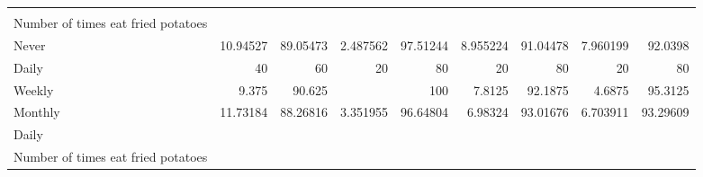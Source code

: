 \documentclass{article}
\begin{document}
\begin{table}[!h]
{\begin{tabular}{lllllllll}
				\multicolumn{1}{r}{} &
				\multicolumn{1}{r}{} &
				\multicolumn{1}{r}{} &
				\multicolumn{1}{r}{} &
				\multicolumn{1}{r}{} &
				\multicolumn{1}{r}{} \\
				\multicolumn{1}{l}{\hspace{4em}Number of times eat fried potatoes} &
				\multicolumn{1}{|r}{} &
				\multicolumn{1}{r}{} &
				\multicolumn{1}{r}{} &
				\multicolumn{1}{r}{} &
				\multicolumn{1}{r}{} &
				\multicolumn{1}{r}{} &
				\multicolumn{1}{r}{} &
				\multicolumn{1}{r}{} \\
				\multicolumn{1}{l}{\hspace{5em}Never} &
				\multicolumn{1}{|r}{10.94527} &
				\multicolumn{1}{r}{89.05473} &
				\multicolumn{1}{r}{2.487562} &
				\multicolumn{1}{r}{97.51244} &
				\multicolumn{1}{r}{8.955224} &
				\multicolumn{1}{r}{91.04478} &
				\multicolumn{1}{r}{7.960199} &
				\multicolumn{1}{r}{92.0398} \\
				\multicolumn{1}{l}{\hspace{5em}Daily} &
				\multicolumn{1}{|r}{40} &
				\multicolumn{1}{r}{60} &
				\multicolumn{1}{r}{20} &
				\multicolumn{1}{r}{80} &
				\multicolumn{1}{r}{20} &
				\multicolumn{1}{r}{80} &
				\multicolumn{1}{r}{20} &
				\multicolumn{1}{r}{80} \\
				\multicolumn{1}{l}{\hspace{5em}Weekly} &
				\multicolumn{1}{|r}{9.375} &
				\multicolumn{1}{r}{90.625} &
				\multicolumn{1}{r}{} &
				\multicolumn{1}{r}{100} &
				\multicolumn{1}{r}{7.8125} &
				\multicolumn{1}{r}{92.1875} &
				\multicolumn{1}{r}{4.6875} &
				\multicolumn{1}{r}{95.3125} \\
				\multicolumn{1}{l}{\hspace{5em}Monthly} &
				\multicolumn{1}{|r}{11.73184} &
				\multicolumn{1}{r}{88.26816} &
				\multicolumn{1}{r}{3.351955} &
				\multicolumn{1}{r}{96.64804} &
				\multicolumn{1}{r}{6.98324} &
				\multicolumn{1}{r}{93.01676} &
				\multicolumn{1}{r}{6.703911} &
				\multicolumn{1}{r}{93.29609} \\
				\multicolumn{1}{l}{\hspace{3em}Daily} &
				\multicolumn{1}{|r}{} &
				\multicolumn{1}{r}{} &
				\multicolumn{1}{r}{} &
				\multicolumn{1}{r}{} &
				\multicolumn{1}{r}{} &
				\multicolumn{1}{r}{} &
				\multicolumn{1}{r}{} &
				\multicolumn{1}{r}{} \\
				\multicolumn{1}{l}{\hspace{4em}Number of times eat fried potatoes} &
				\multicolumn{1}{|r}{} &

\end{tabular}}
\end{table}
\end{document}
